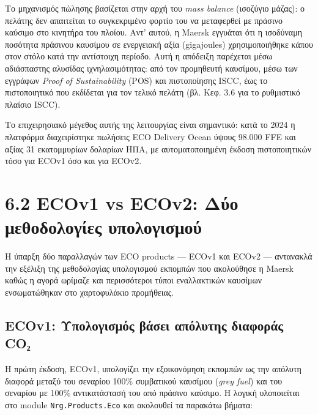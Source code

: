 Το μηχανισμός πώλησης βασίζεται στην αρχή του \emph{mass balance}
(ισοζύγιο μάζας): ο πελάτης δεν απαιτείται το συγκεκριμένο φορτίο του να
μεταφερθεί με πράσινο καύσιμο στο κινητήρα του πλοίου. Αντ' αυτού, η
Maersk εγγυάται ότι η ισοδύναμη ποσότητα πράσινου καυσίμου σε ενεργειακή
αξία (gigajoules) χρησιμοποιήθηκε κάπου στον στόλο κατά την αντίστοιχη
περίοδο. Αυτή η απόδειξη παρέχεται μέσω αδιάσπαστης αλυσίδας
ιχνηλασιμότητας: από τον προμηθευτή καυσίμου, μέσω των εγγράφων
\emph{Proof of Sustainability} (POS) και πιστοποίησης ISCC, έως το
πιστοποιητικό που εκδίδεται για τον τελικό πελάτη (βλ. Κεφ. 3.6 για το
ρυθμιστικό πλαίσιο ISCC).

Το επιχειρησιακό μέγεθος αυτής της λειτουργίας είναι σημαντικό: κατά το
2024 η πλατφόρμα διαχειρίστηκε πωλήσεις ECO Delivery Ocean ύψους 98.000
FFE και αξίας 31 εκατομμυρίων δολαρίων ΗΠΑ, με αυτοματοποιημένη έκδοση
πιστοποιητικών τόσο για ECOv1 όσο και για ECOv2.

\section{6.2 ECOv1 vs ECOv2: Δύο μεθοδολογίες
υπολογισμού}\label{ecov1-vs-ecov2-ux3b4ux3cdux3bf-ux3bcux3b5ux3b8ux3bfux3b4ux3bfux3bbux3bfux3b3ux3afux3b5ux3c2-ux3c5ux3c0ux3bfux3bbux3bfux3b3ux3b9ux3c3ux3bcux3bfux3cd}

Η ύπαρξη δύο παραλλαγών των ECO products --- ECOv1 και ECOv2 ---
αντανακλά την εξέλιξη της μεθοδολογίας υπολογισμού εκπομπών που
ακολούθησε η Maersk καθώς η αγορά ωρίμαζε και περισσότεροι τύποι
εναλλακτικών καυσίμων ενσωματώθηκαν στο χαρτοφυλάκιο προμήθειας.

\subsection{ECOv1: Υπολογισμός βάσει απόλυτης διαφοράς
CO₂}\label{ecov1-ux3c5ux3c0ux3bfux3bbux3bfux3b3ux3b9ux3c3ux3bcux3ccux3c2-ux3b2ux3acux3c3ux3b5ux3b9-ux3b1ux3c0ux3ccux3bbux3c5ux3c4ux3b7ux3c2-ux3b4ux3b9ux3b1ux3c6ux3bfux3c1ux3acux3c2-coux2082}

Η πρώτη έκδοση, ECOv1, υπολογίζει την εξοικονόμηση εκπομπών ως την
απόλυτη διαφορά μεταξύ του σεναρίου 100\% συμβατικού καυσίμου
(\emph{grey fuel}) και του σεναρίου με 100\% αντικατάστασή του από
πράσινο καύσιμο. Η λογική υλοποιείται στο module
\texttt{Nrg.Products.Eco} και ακολουθεί τα παρακάτω βήματα:

